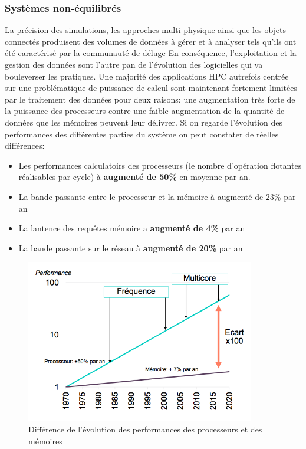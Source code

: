 \subsubsection{Systèmes non-équilibrés}

La précision des simulations, les approches multi-physique ainsi que les objets connectés produisent des volumes de données à gérer et à analyser tels qu'ils ont été caractérisé par la communauté de déluge %
En conséquence, l'exploitation et la gestion des données sont l'autre pan de l'évolution des logicielles qui va bouleverser les pratiques. Une majorité des applications HPC autrefois centrée sur une problématique de puissance de calcul sont maintenant fortement limitées par le traitement des données pour deux raisons: une augmentation très forte de la puissance des processeurs contre une faible augmentation de la quantité de données que les mémoires peuvent leur délivrer. Si on regarde l'évolution des performances des différentes parties du système on peut constater de réelles différences:
\begin{itemize}
    \item Les performances calculatoirs des processeurs (le nombre d'opération flotantes réalisables par cycle) à \textbf{augmenté de 50\%} en moyenne par an.
    \item La bande passante entre le processeur et la mémoire à augmenté de 23\% par an
    \item La lantence des requêtes mémoire a \textbf{augmenté de 4\% }par an
    \item La bande passante sur le réseau à \textbf{augmenté de 20\%} par an
\end{itemize}

\begin{figure}
    \center
    \includegraphics[width=10cm]{images/Chapitre1/memory_gap.png}
    \caption{\label{pic_memory_gap} Différence de l'évolution des performances des processeurs et des mémoires }
\end{figure}

